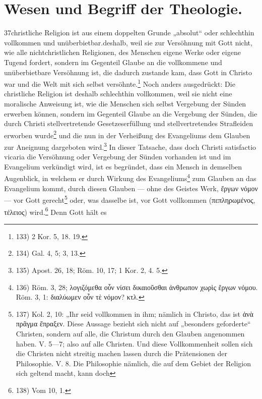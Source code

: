 \section*{Wesen und Begriff der Theologie.}\n\hfill 37\n\nDie christliche Religion ist aus einem doppelten Grunde „absolut“ oder schlechthin vollkommen und unüberbietbar.\n\nErstlich deshalb, weil sie zur Versöhnung mit Gott nicht, wie alle nichtchristlichen Religionen, des Menschen eigene Werke oder eigene Tugend fordert, sondern im Gegenteil Glaube an die vollkommene und unüberbietbare Versöhnung ist, die dadurch zustande kam, dass Gott in Christo war und die Welt mit sich selbst versöhnte.\footnote{133) 2 Kor. 5, 18. 19.} Noch anders ausgedrückt: Die christliche Religion ist deshalb schlechthin vollkommen, weil sie nicht eine moralische Anweisung ist, wie die Menschen sich selbst Vergebung der Sünden erwerben können, sondern im Gegenteil Glaube an die Vergebung der Sünden, die durch Christi stellvertretende Gesetzeserfüllung und stellvertretendes Strafleiden erworben wurde\footnote{134) Gal. 4, 5; 3, 13.} und die nun in der Verheißung des Evangeliums dem Glauben zur Aneignung dargeboten wird.\footnote{135) Apost. 26, 18; Röm. 10, 17; 1 Kor. 2, 4. 5.} In dieser Tatsache, dass doch Christi satisfactio vicaria die Versöhnung oder Vergebung der Sünden vorhanden ist und im Evangelium verkündigt wird, ist es begründet, dass ein Mensch in demselben Augenblick, in welchem er durch Wirkung des Evangeliums\footnote{136) Röm. 3, 28; λογιζόμεθα οὖν νίσει δικαιοῦσθαι ἀνθρωπον χωρὶς ἔργων νόμου. Röm. 3, 1: διαλύωμεν οὖν τὲ νόμον? κτλ.} zum Glauben an das Evangelium kommt, durch diesen Glauben — ohne des Geistes Werk, ἔργων νόμον — vor Gott gerecht\footnote{137) Kol. 2, 10: „Ihr seid vollkommen in ihm; nämlich in Christo, das ist ἀνὰ πρᾶγμα ἔπραξεν. Diese Aussage bezieht sich nicht auf „besonders geforderte“ Christen, sondern auf alle, die Christum durch den Glauben angenommen haben. V. 5—7; also auf alle Christen. Und diese Vollkommenheit sollen sich die Christen nicht streitig machen lassen durch die Prätensionen der Philosophie. V. 8. Die Philosophie nämlich, die auf dem Gebiet der Religion sich geltend macht, kann doch} oder, was dasselbe ist, vor Gott vollkommen (πεπληρωμένος, τέλειος) wird.\footnote{138) Vom 10, 1.} Denn Gott hält es